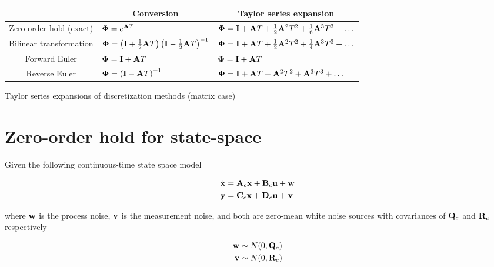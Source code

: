 \begin{booktable}
  \begin{tabular}{|cll|}
    \hline
    \rowcolor{headingbg}
    \multicolumn{1}{|c}{\textbf{Discretization method}} &
      \multicolumn{1}{c}{\textbf{Conversion}} &
      \multicolumn{1}{c|}{\textbf{Taylor series expansion}} \\
    \hline
    Zero-order hold (exact) &
      $\mathbf{\Phi} = e^{\mathbf{A}T}$ &
      $\mathbf{\Phi} = \mathbf{I} + \mathbf{A}T + \frac{1}{2}\mathbf{A}^2T^2 +
        \frac{1}{6}\mathbf{A}^3T^3 + \ldots$ \\
    Bilinear transformation &
      $\mathbf{\Phi} =
        \left(\mathbf{I} + \frac{1}{2}\mathbf{A}T\right)
        \left(\mathbf{I} - \frac{1}{2}\mathbf{A}T\right)^{-1}$ &
      $\mathbf{\Phi} = \mathbf{I} + \mathbf{A}T + \frac{1}{2}\mathbf{A}^2T^2 +
        \frac{1}{4}\mathbf{A}^3T^3 + \ldots$ \\
    Forward Euler &
      $\mathbf{\Phi} = \mathbf{I} + \mathbf{A}T$ &
      $\mathbf{\Phi} = \mathbf{I} + \mathbf{A}T$ \\
    Reverse Euler &
      $\mathbf{\Phi} = \left(\mathbf{I} - \mathbf{A}T\right)^{-1}$ &
      $\mathbf{\Phi} =
        \mathbf{I} + \mathbf{A}T + \mathbf{A}^2T^2 + \mathbf{A}^3T^3 + \ldots$ \\
    \hline
  \end{tabular}
  \caption{Taylor series expansions of discretization methods (matrix case)}
  \label{tab:disc_approx_matrix}
\end{booktable}

\section{Zero-order hold for state-space}

Given the following continuous-time state space model

\begin{align*}
  \dot{\mathbf{x}} &= \mathbf{A}_c\mathbf{x} + \mathbf{B}_c\mathbf{u} + \mathbf{w} \\
  \mathbf{y} &= \mathbf{C}_c\mathbf{x} + \mathbf{D}_c\mathbf{u} + \mathbf{v}
\end{align*}

where $\mathbf{w}$ is the process noise, $\mathbf{v}$ is the measurement noise, and
both are zero-mean white noise sources with covariances of $\mathbf{Q}_c$ and
$\mathbf{R}_c$ respectively

\begin{align*}
  \mathbf{w} &\sim N(0, \mathbf{Q}_c) \\
  \mathbf{v} &\sim N(0, \mathbf{R}_c)
\end{align*}

